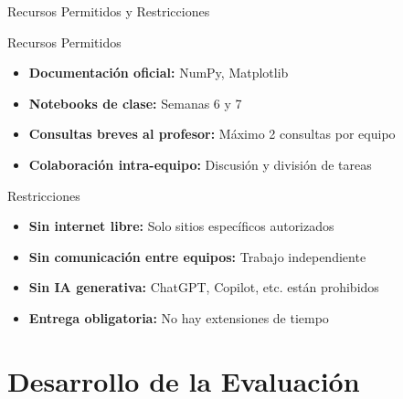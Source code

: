 \documentclass[10pt]{beamer}
\begin{document}
\begin{frame}{Recursos Permitidos y Restricciones}
  \begin{block}{Recursos Permitidos}
    \begin{itemize}
      \item \textbf{Documentación oficial:} NumPy, Matplotlib
      \item \textbf{Notebooks de clase:} Semanas 6 y 7
      \item \textbf{Consultas breves al profesor:} Máximo 2 consultas por equipo
      \item \textbf{Colaboración intra-equipo:} Discusión y división de tareas
    \end{itemize}
  \end{block}
  
  \begin{alertblock}{Restricciones}
    \begin{itemize}
      \item \textbf{Sin internet libre:} Solo sitios específicos autorizados
      \item \textbf{Sin comunicación entre equipos:} Trabajo independiente
      \item \textbf{Sin IA generativa:} ChatGPT, Copilot, etc. están prohibidos
      \item \textbf{Entrega obligatoria:} No hay extensiones de tiempo
    \end{itemize}
  \end{alertblock}
\end{frame}

\section{Desarrollo de la Evaluación}
\end{document}
